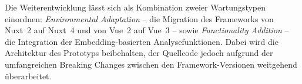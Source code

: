 Die Weiterentwicklung lässt sich als Kombination zweier Wartungstypen einordnen:
\emph{Environmental Adaptation} -- die Migration des Frameworks von Nuxt~2 auf Nuxt~4 und von Vue~2 auf Vue~3 -- sowie \emph{Functionality Addition} -- die Integration der Embedding-basierten Analysefunktionen.
Dabei wird die Architektur des Prototyps beibehalten, der Quellcode jedoch aufgrund der umfangreichen Breaking Changes zwischen den Framework-Versionen weitgehend überarbeitet.
